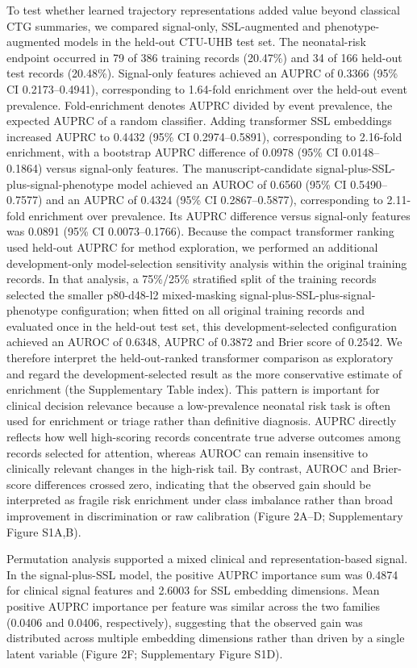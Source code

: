 \documentclass[utf8]{FrontiersinHarvard}
\begin{document}
To test whether learned trajectory representations added value beyond classical CTG summaries, we compared signal-only, SSL-augmented and phenotype-augmented models in the held-out CTU-UHB test set. The neonatal-risk endpoint occurred in 79 of 386 training records (20.47\%) and 34 of 166 held-out test records (20.48\%). Signal-only features achieved an AUPRC of 0.3366 (95\% CI 0.2173--0.4941), corresponding to 1.64-fold enrichment over the held-out event prevalence. Fold-enrichment denotes AUPRC divided by event prevalence, the expected AUPRC of a random classifier. Adding transformer SSL embeddings increased AUPRC to 0.4432 (95\% CI 0.2974--0.5891), corresponding to 2.16-fold enrichment, with a bootstrap AUPRC difference of 0.0978 (95\% CI 0.0148--0.1864) versus signal-only features. The manuscript-candidate signal-plus-SSL-plus-signal-phenotype model achieved an AUROC of 0.6560 (95\% CI 0.5490--0.7577) and an AUPRC of 0.4324 (95\% CI 0.2867--0.5877), corresponding to 2.11-fold enrichment over prevalence. Its AUPRC difference versus signal-only features was 0.0891 (95\% CI 0.0073--0.1766). Because the compact transformer ranking used held-out AUPRC for method exploration, we performed an additional development-only model-selection sensitivity analysis within the original training records. In that analysis, a 75\%/25\% stratified split of the training records selected the smaller p80-d48-l2 mixed-masking signal-plus-SSL-plus-signal-phenotype configuration; when fitted on all original training records and evaluated once in the held-out test set, this development-selected configuration achieved an AUROC of 0.6348, AUPRC of 0.3872 and Brier score of 0.2542. We therefore interpret the held-out-ranked transformer comparison as exploratory and regard the development-selected result as the more conservative estimate of enrichment (the Supplementary Table index). This pattern is important for clinical decision relevance because a low-prevalence neonatal risk task is often used for enrichment or triage rather than definitive diagnosis. AUPRC directly reflects how well high-scoring records concentrate true adverse outcomes among records selected for attention, whereas AUROC can remain insensitive to clinically relevant changes in the high-risk tail. By contrast, AUROC and Brier-score differences crossed zero, indicating that the observed gain should be interpreted as fragile risk enrichment under class imbalance rather than broad improvement in discrimination or raw calibration (Figure 2A--D; Supplementary Figure S1A,B).

Permutation analysis supported a mixed clinical and representation-based signal. In the signal-plus-SSL model, the positive AUPRC importance sum was 0.4874 for clinical signal features and 2.6003 for SSL embedding dimensions. Mean positive AUPRC importance per feature was similar across the two families (0.0406 and 0.0406, respectively), suggesting that the observed gain was distributed across multiple embedding dimensions rather than driven by a single latent variable (Figure 2F; Supplementary Figure S1D).
\end{document}

